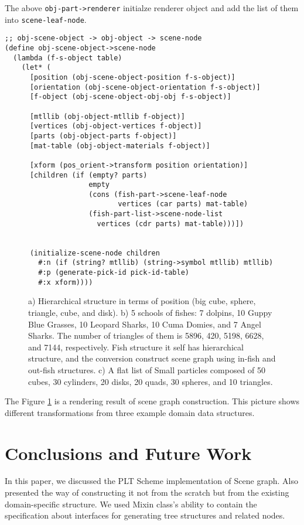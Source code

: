 \documentclass[preprint,nocopyrightspace]{sigplanconf}
\begin{document}
The above \texttt{obj-part->renderer} initialze renderer object and add the list of them into \texttt{scene-leaf-node}. 

{\small
\begin{verbatim}
;; obj-scene-object -> obj-object -> scene-node 
(define obj-scene-object->scene-node
  (lambda (f-s-object table)
    (let* (
      [position (obj-scene-object-position f-s-object)]
      [orientation (obj-scene-object-orientation f-s-object)]
      [f-object (obj-scene-object-obj-obj f-s-object)]
             
      [mtllib (obj-object-mtllib f-object)]
      [vertices (obj-object-vertices f-object)]
      [parts (obj-object-parts f-object)]
      [mat-table (obj-object-materials f-object)]
             
      [xform (pos_orient->transform position orientation)]
      [children (if (empty? parts)
                    empty
                    (cons (fish-part->scene-leaf-node 
                           vertices (car parts) mat-table)
                    (fish-part-list->scene-node-list 
                      vertices (cdr parts) mat-table)))])

        
      (initialize-scene-node children
        #:n (if (string? mtllib) (string->symbol mtllib) mtllib)
        #:p (generate-pick-id pick-id-table)
        #:x xform))))
\end{verbatim}

\begin{figure}
\begin{center}
\end{center}

\caption{ a) Hierarchical structure in terms of position (big cube, sphere, triangle, cube, and disk). b) 5 schools of fishes: 7 dolpins, 10 Guppy Blue Grasses, 10 Leopard
Sharks, 10 Cuma Domies, and 7 Angel Sharks. The number of triangles of them is
5896, 420, 5198, 6628, and 7144, respectively. Fish structure it self has
hierarchical structure, and the conversion construct scene graph using in-fish and out-fish structures. c) A flat list of Small particles composed of
50 cubes, 30 cylinders, 20 disks, 20 quads, 30 spheres, and 10 triangles.
\label{pic}
}
\end{figure}

The Figure \ref{pic} is a rendering result of scene graph construction. 
This picture shows different transformations from three example domain data structures.


\section{Conclusions and Future Work}
In this paper, we discussed the PLT Scheme implementation of Scene graph. Also presented the way of constructing 
it not from the scratch but from the existing domain-specific structure. We used Mixin class's ability to contain the specification about interfaces for generating tree structures and related nodes. 

}
\end{document}
